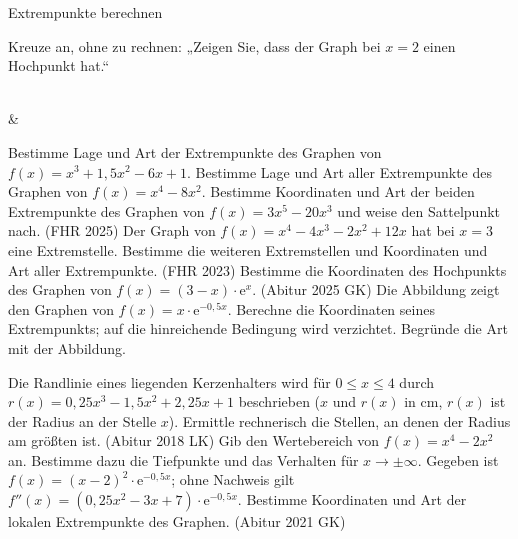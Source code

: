 \setcounter{aufgabe}{10}

\begin{aufgabe}{Extrempunkte berechnen}
\begin{teile}
\teil Kreuze an, ohne zu rechnen: „Zeigen Sie, dass der Graph bei $x = 2$ einen Hochpunkt hat.“ \\  \\ 
\end{teile}
\begin{gleichungsraster}[2]
 &
\end{gleichungsraster}
\begin{teile}
\teil Bestimme Lage und Art der Extrempunkte des Graphen von $f(x) = x^3 + 1{,}5x^2 - 6x + 1$.
\teil Bestimme Lage und Art aller Extrempunkte des Graphen von $f(x) = x^4 - 8x^2$.
\teil Bestimme Koordinaten und Art der beiden Extrempunkte des Graphen von $f(x) = 3x^5 - 20x^3$ und weise den Sattelpunkt nach. \hfill (FHR 2025)
\teil Der Graph von $f(x) = x^4 - 4x^3 - 2x^2 + 12x$ hat bei $x = 3$ eine Extremstelle. Bestimme die weiteren Extremstellen und Koordinaten und Art aller Extrempunkte. \hfill (FHR 2023)
\teil Bestimme die Koordinaten des Hochpunkts des Graphen von $f(x) = (3 - x) \cdot \mathrm{e}^{x}$. \hfill (Abitur 2025 GK)
\teil Die Abbildung zeigt den Graphen von $f(x) = x \cdot \mathrm{e}^{-0{,}5x}$. Berechne die Koordinaten seines Extrempunkts; auf die hinreichende Bedingung wird verzichtet. Begründe die Art mit der Abbildung.

\begin{ksys}[xmin=0,xmax=6,ymin=-1,ymax=1,ablesen]  \end{ksys}
\teil Die Randlinie eines liegenden Kerzenhalters wird für $0 \le x \le 4$ durch $r(x) = 0{,}25x^3 - 1{,}5x^2 + 2{,}25x + 1$ beschrieben ($x$ und $r(x)$ in cm, $r(x)$ ist der Radius an der Stelle $x$). Ermittle rechnerisch die Stellen, an denen der Radius am größten ist. \hfill (Abitur 2018 LK)
\teil Gib den Wertebereich von $f(x) = x^4 - 2x^2$ an. Bestimme dazu die Tiefpunkte und das Verhalten für $x \to \pm\infty$.
\teil Gegeben ist $f(x) = (x - 2)^2 \cdot \mathrm{e}^{-0{,}5x}$; ohne Nachweis gilt $f''(x) = (0{,}25x^2 - 3x + 7) \cdot \mathrm{e}^{-0{,}5x}$. Bestimme Koordinaten und Art der lokalen Extrempunkte des Graphen. \hfill (Abitur 2021 GK)
\end{teile}
\end{aufgabe}

